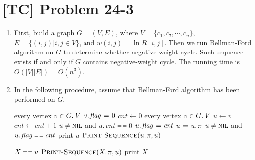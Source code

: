 \documentclass[a4paper,11pt,twocolumn]{article}
\newcommand{\NIL}{\const{nil}}
\newcommand{\FALSE}{\const{false}}
\newcommand{\TRUE}{\const{true}}
\begin{document}
  \section{[TC] Problem 24-3}
  \begin{enumerate}
  \item First, build a graph $G=(V, E)$, where $V = \{c_1, c_2, \cdots, c_n\}$, $E = \{(i, j)| i, j \in V\}$, and $w(i, j) = \ln R[i,j]$. Then we run Bellman-Ford algorithm on $G$ to determine whether negative-weight cycle. Such sequence exists if and only if $G$ contains negative-weight cycle. The running time is $O(|V||E|) = O(n^3)$.
  \item In the following procedure, assume that Bellman-Ford algorithm has been performed on $G$.
  \begin{codebox}
  \li \For every vertex $v \in \attrib{G}{V}$
  \li \Do  $\attrib{v}{flag} \gets 0$
      \End
  \li $cnt \gets 0$
  \li \For every vertex $v \in \attrib{G}{V}$
  \li \Do $u \gets v$
  \li     $cnt \gets cnt + 1$
  \li     \While $u \neq \NIL$ and $\attrib{u}{cnt} \isequal 0$
  \li     \Do $\attrib{u}{flag} \gets cnt$
  \li         $u \gets \attrib{u}{\pi}$
  \li         \If $u \neq \NIL$ and $\attrib{u}{flag} \isequal cnt$
  \li         \Do print $u$
  \li             $\proc{Print-Sequence}(\attrib{u}{\pi}, u)$
  \li         \Return \TRUE
              \End
          \End
      \End
  \li \Return \FALSE
  \end{codebox}
  \begin{codebox}
  \li \If $X \isequal u$
  \li \Do \Return
      \End
  \li $\proc{Print-Sequence}(\attrib{X}{\pi}, u)$
  \li print $X$
  \end{codebox}
  \end{enumerate}
\end{document}
